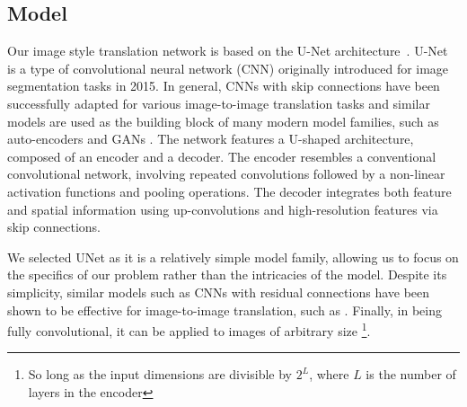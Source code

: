 \subsection{Model}
\label{subsec:model}

Our image style translation network is based on the U-Net
architecture~\cite{unet}. U-Net is a type of convolutional neural network (CNN)
originally introduced for image segmentation tasks in 2015. In general, CNNs with skip connections have been
successfully adapted for various image-to-image translation tasks and similar models are used as the
building block of many modern model families, such as auto-encoders \cite{raw-to-raw} and GANs \cite{perceptual-losses-style-transfer}. The network features a U-shaped architecture, composed of an encoder and a decoder. The encoder
resembles a conventional convolutional network, involving repeated convolutions
followed by a non-linear activation functions and pooling operations. The decoder integrates both feature and spatial information using up-convolutions and high-resolution features via skip connections.

We selected UNet as it
is a relatively simple model family, allowing us to focus on
the specifics of our problem rather than the intricacies of the model. Despite its simplicity, similar models such as CNNs with residual connections have been shown to be effective for image-to-image translation, such as \cite{dslr-quality}. Finally,
in being fully convolutional, it can be applied to images of arbitrary size
\footnote{So long as the input dimensions are divisible by $2^L$, where $L$ is
the number of layers in the encoder}.  



